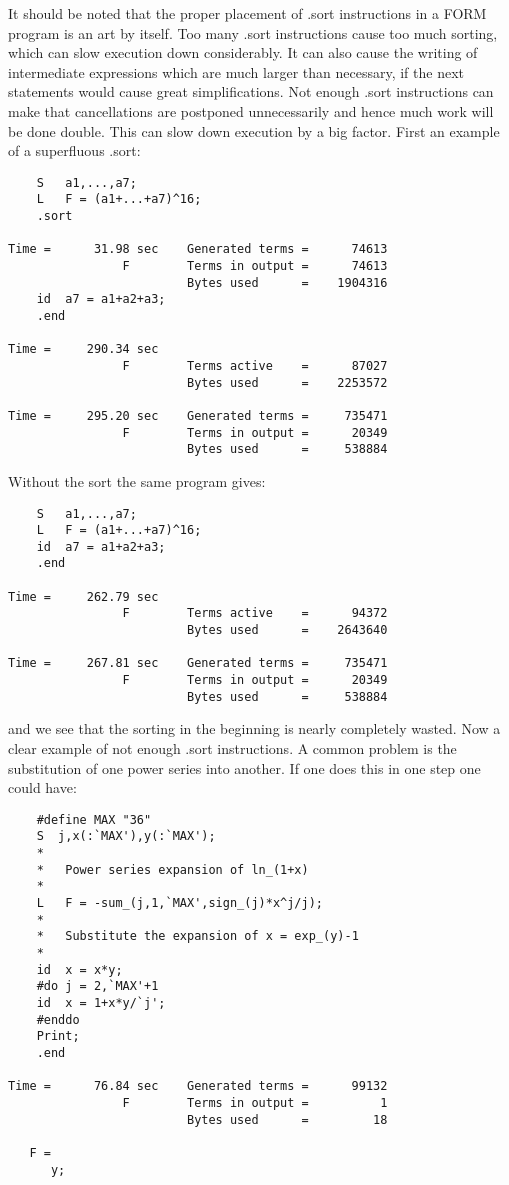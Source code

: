 It should be noted that the proper placement of .sort 
instructions in a FORM program is an art by itself. Too many .sort 
instructions cause too much sorting, which can slow execution down 
considerably. It can also cause the writing of intermediate expressions 
which are much larger than necessary, if the next statements would cause 
great simplifications. Not enough .sort instructions can make that 
cancellations are postponed unnecessarily and hence much work will be done 
double. This can slow down execution by a big factor. First an example of a 
superfluous .sort:
\begin{verbatim}
    S	a1,...,a7;
    L	F = (a1+...+a7)^16;
    .sort

Time =      31.98 sec    Generated terms =      74613
                F        Terms in output =      74613
                         Bytes used      =    1904316
    id	a7 = a1+a2+a3;
    .end

Time =     290.34 sec
                F        Terms active    =      87027
                         Bytes used      =    2253572

Time =     295.20 sec    Generated terms =     735471
                F        Terms in output =      20349
                         Bytes used      =     538884
\end{verbatim}
Without the sort the same program gives:
\begin{verbatim}
    S	a1,...,a7;
    L	F = (a1+...+a7)^16;
    id	a7 = a1+a2+a3;
    .end

Time =     262.79 sec
                F        Terms active    =      94372
                         Bytes used      =    2643640

Time =     267.81 sec    Generated terms =     735471
                F        Terms in output =      20349
                         Bytes used      =     538884
\end{verbatim}
and we see that the sorting in the beginning is nearly completely wasted. 
Now a clear example of not enough .sort instructions. A common problem is 
the substitution of one power series into another. If 
one does this in one step one could have:
\begin{verbatim}
    #define MAX "36"
    S  j,x(:`MAX'),y(:`MAX');
    *
    *	Power series expansion of ln_(1+x)
    *
    L	F = -sum_(j,1,`MAX',sign_(j)*x^j/j);
    *
    *	Substitute the expansion of x = exp_(y)-1
    *
    id	x = x*y;
    #do j = 2,`MAX'+1
    id	x = 1+x*y/`j';
    #enddo
    Print;
    .end

Time =      76.84 sec    Generated terms =      99132
                F        Terms in output =          1
                         Bytes used      =         18

   F =
      y;
\end{verbatim}

